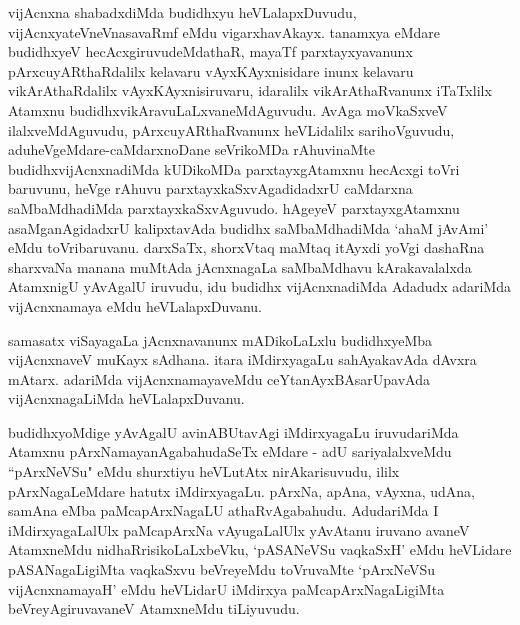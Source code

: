 \begin{artha}
vijAcnxna shabadxdiMda budidhxyu heVLalapxDuvudu, vijAcnxyateV\s neVnasavaRmf eMdu vigarxhavAkayx. tanamxya eMdare budidhxyeV hecAcxgiruvudeMdathaR, mayaTf parxtayxyavanunx pArxcuyARthaRdalilx kelavaru vAyxKAyxnisidare inunx kelavaru vikArAthaRdalilx vAyxKAyxnisiruvaru, idaralilx vikArAthaRvanunx iTaTxlilx Atamxnu budidhxvikAravuLaLxvaneMdAguvudu. AvAga moVkaSxveV ilalxveMdAguvudu, pArxcuyARthaRvanunx heVLidalilx sarihoVguvudu, aduheVgeMdare-caMdarxnoDane seVrikoMDa rAhuvinaMte budidhxvijAcnxnadiMda kUDikoMDa parxtayxgAtamxnu hecAcxgi toVri baruvunu, heVge rAhuvu parxtayxkaSxvAgadidadxrU caMdarxna saMbaMdhadiMda parxtayxkaSxvAguvudo. hAgeyeV parxtayxgAtamxnu asaMganAgidadxrU kalipxtavAda budidhx saMbaMdhadiMda `ahaM jAvAmi' eMdu toVribaruvanu. darxSaTx, shorxVtaq maMtaq itAyxdi yoVgi dashaRna sharxvaNa manana muMtAda jAcnxnagaLa saMbaMdhavu kArakavalalxda AtamxnigU yAvAgalU iruvudu, idu budidhx vijAcnxnadiMda Adadudx adariMda vijAcnxnamaya eMdu heVLalapxDuvanu. 
\end{artha}

\begin{artha}
samasatx viSayagaLa jAcnxnavanunx mADikoLaLxlu budidhxyeMba vijAcnxnaveV muKayx sAdhana. itara iMdirxyagaLu sahAyakavAda dAvxra mAtarx. adariMda vijAcnxnamayaveMdu ceYtanAyxBAsarUpavAda vijAcnxnagaLiMda heVLalapxDuvanu.
\end{artha}


\begin{artha}
budidhxyoMdige yAvAgalU avinABUtavAgi iMdirxyagaLu iruvudariMda Atamxnu pArxNamayanAgabahudaSeTx eMdare - adU sariyalalxveMdu ``pArxNeVSu" eMdu shurxtiyu heVLutAtx nirAkarisuvudu, ililx pArxNagaLeMdare hatutx iMdirxyagaLu. pArxNa, apAna, vAyxna, udAna, samAna eMba paMcapArxNagaLU athaRvAgabahudu. AdudariMda I iMdirxyagaLalUlx paMcapArxNa vAyugaLalUlx yAvAtanu iruvano avaneV AtamxneMdu nidhaRrisikoLaLxbeVku, `pASANeVSu vaqkaSxH' eMdu heVLidare pASANagaLigiMta vaqkaSxvu beVreyeMdu toVruvaMte `pArxNeVSu vijAcnxnamayaH' eMdu heVLidarU iMdirxya paMcapArxNagaLigiMta beVreyAgiruvavaneV AtamxneMdu tiLiyuvudu. 
\end{artha}%


